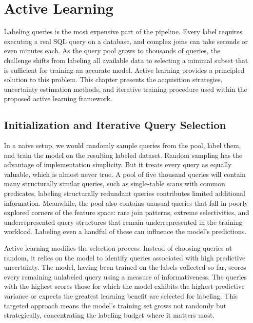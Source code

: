 \chapter{Active Learning}
\label{chap:active_learning}
\pagestyle{plain}

Labeling queries is the most expensive part of the pipeline. Every label requires executing a real SQL query on a database, and complex joins can take seconds or even minutes each. As the query pool grows to thousands of queries, the challenge shifts from labeling all available data to selecting a minimal subset that is sufficient for training an accurate model. Active learning provides a principled solution to this problem\cite{activelearningdriven}. This chapter presents the acquisition strategies, uncertainty estimation methods, and iterative training procedure used within the proposed active learning framework.


\section{Initialization and Iterative Query Selection}

In a naive setup, we would randomly sample queries from the pool, label them, and train the model on the resulting labeled dataset. Random sampling has the advantage of implementation simplicity. But it treats every query as equally valuable, which is almost never true. A pool of five thousand queries will contain many structurally similar queries, such as single-table scans with common predicates, labeling structurally redundant queries contributes limited additional information. Meanwhile, the pool also contains unusual queries that fall in poorly explored corners of the feature space: rare join patterns, extreme selectivities, and underrepresented query structures that remain underrepresented in the training workload. Labeling even a handful of these can influence the model's predictions.

Active learning modifies the selection process. Instead of choosing queries at random, it relies on the model to identify queries associated with high predictive uncertainty. The model, having been trained on the labels collected so far, scores every remaining unlabeled query using a measure of informativeness. The queries with the highest scores those for which the model exhibits the highest predictive variance or expects the greatest learning benefit are selected for labeling. This targeted approach means the model's training set grows not randomly but strategically, concentrating the labeling budget where it matters most.


